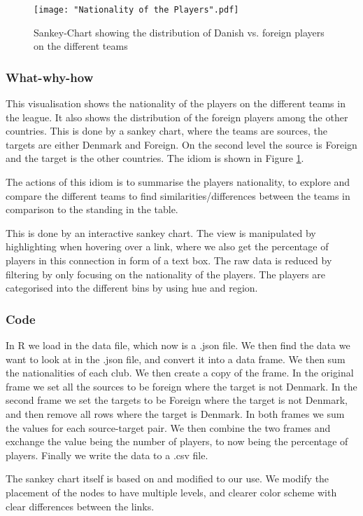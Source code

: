 \documentclass[Report.tex]{subfiles}
\begin{document}
\begin{figure}
\center
\texttt{[image: "Nationality of the Players".pdf]}
\caption{Sankey-Chart showing the distribution of Danish vs. foreign players on the different teams}
\label{Fig:Nationality}
\end{figure}


\subsubsection{What-why-how}
This visualisation shows the nationality of the players on the different teams in the league. It also shows the distribution of the foreign players among the other countries. This is done by a sankey chart, where the teams are sources, the targets are either Denmark and Foreign. On the second level the source is Foreign and the target is the other countries. The idiom is shown in Figure \ref{Fig:Nationality}.

The actions of this idiom is to summarise the players nationality, to explore and compare the different teams to find similarities/differences between the teams in comparison to the standing in the table. 

This is done by an interactive sankey chart. The view is manipulated by highlighting when hovering over a link, where we also get the percentage of players in this connection in form of a text box. The raw data is reduced by filtering by only focusing on the nationality of the players. The players are categorised into the different bins by using hue and region.

\subsubsection{Code}
In R we load in the data file, which now is a .json file. We then find the data we want to look at in the .json file, and convert it into a data frame. We then sum the nationalities of each club. We then create a copy of the frame. In the original frame we set all the sources to be foreign where the target is not Denmark. In the second frame we set the targets to be Foreign where the target is not Denmark, and then remove all rows where the target is Denmark. In both frames we sum the values for each source-target pair. We then combine the two frames and exchange the value being the number of players, to now being the percentage of players. Finally we write the data to a .csv file.

The sankey chart itself is based on \cite{Sankey} and modified to our use. We modify the placement of the nodes to have multiple levels, and clearer color scheme with clear differences between the links.
\end{document}
